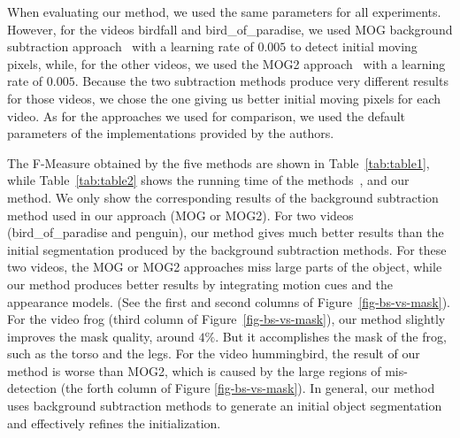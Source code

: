 When evaluating our method, we used the same parameters for all experiments. However, for the videos birdfall and bird\_of\_paradise, we used MOG background subtraction approach~\cite{kaewtrakulpong2002} with a learning rate of $0.005$ to detect initial moving pixels, while, for the other videos, we used the MOG2 approach~\cite{zivkovic2004} with a learning rate of $0.005$. Because the two subtraction methods produce very different results for those videos, we chose the one giving us better initial moving pixels for each video.
As for the approaches we used for comparison, we used the default parameters of the implementations provided by the authors.

The F-Measure obtained by the five methods are shown in Table~\ref{tab:table1}, while Table~\ref{tab:table2} shows the running time of the methods~\cite{papazoglou2013}, \cite{zhang2013} and our method.
We only show the corresponding results of the background subtraction method used in our approach (MOG or MOG2).
For two videos (bird\_of\_paradise and penguin), our method gives much better results than the initial segmentation produced by the background subtraction methods. For these two videos, the MOG or MOG2 approaches miss large parts of the object, while our method produces better results by integrating motion cues and the appearance models. (See the first and second columns of Figure~\ref{fig-bs-vs-mask}).
For the video frog (third column of Figure~\ref{fig-bs-vs-mask}), our method slightly improves the mask quality, around $4\%$. But it accomplishes the mask of the frog, such as the torso and the legs.
For the video hummingbird, the result of our method is worse than MOG2, which is caused by the large regions of mis-detection (the forth column of Figure \ref{fig-bs-vs-mask}).
In general, our method uses background subtraction methods to generate an initial object segmentation and effectively refines the initialization.


